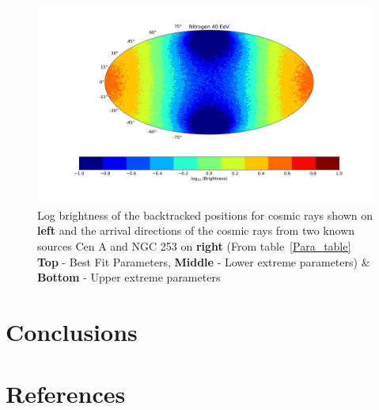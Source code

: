 \documentclass[12pt, a4 paper]{article}
\begin{document}
\begin{figure}[t]
\begin{center}
    \includegraphics[width=12.0cm]{Images/Log_Bins_180_Historgam_UB_N2_Str_Tur_TM_40_EeV.png}
\end{center}
\caption{Log brightness of the backtracked positions for cosmic rays shown on \textbf{left} and the arrival directions of the cosmic rays from two known sources Cen A and NGC 253 on \textbf{right} (From table~\ref{Para_table} \textbf{Top} - Best Fit Parameters, {\textbf{Middle} - Lower extreme parameters)} \& {\textbf{Bottom} - Upper extreme parameters}}
\label{fig:AD_Plots}
\end{figure}

\section{Conclusions}
\label{Conclusions}

\clearpage
\section{References}

\printbibliography[heading=none]

\nocite{*}

\newpage
\end{document}
